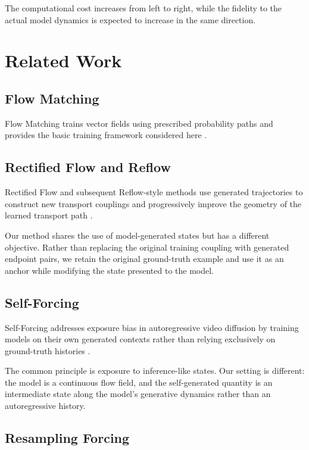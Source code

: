 \documentclass[11pt]{article}
\begin{document}
The computational cost increases from left to right, while the fidelity to
the actual model dynamics is expected to increase in the same direction.

\section{Related Work}

\subsection{Flow Matching}

Flow Matching trains vector fields using prescribed probability paths and
provides the basic training framework considered here
\cite{lipman2023fm}.

\subsection{Rectified Flow and Reflow}

Rectified Flow and subsequent Reflow-style methods use generated trajectories
to construct new transport couplings and progressively improve the geometry of
the learned transport path \cite{liu2023rectified}.

Our method shares the use of model-generated states but has a different
objective. Rather than replacing the original training coupling with
generated endpoint pairs, we retain the original ground-truth example and use
it as an anchor while modifying the state presented to the model.

\subsection{Self-Forcing}

Self-Forcing addresses exposure bias in autoregressive video diffusion by
training models on their own generated contexts rather than relying exclusively
on ground-truth histories \cite{huang2025selfforcing}.

The common principle is exposure to inference-like states. Our setting is
different: the model is a continuous flow field, and the self-generated
quantity is an intermediate state along the model's generative dynamics rather
than an autoregressive history.

\subsection{Resampling Forcing}
\end{document}
